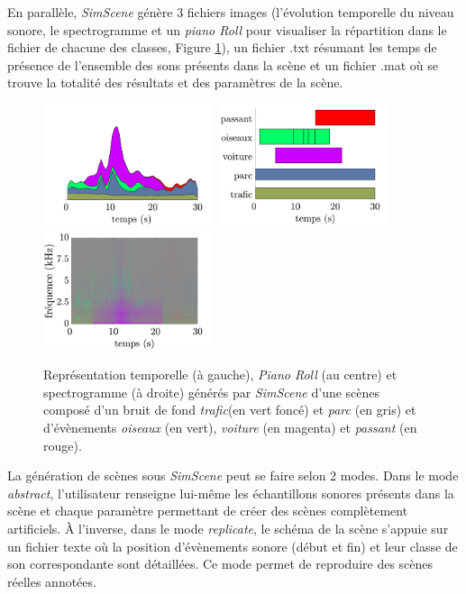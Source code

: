 En parallèle, \textit{SimScene} génère 3 fichiers images (l'évolution temporelle du niveau sonore, le spectrogramme et un \textit{piano Roll} pour visualiser la répartition dans le fichier de chacune des classes, Figure \ref{fig:somefiglabel}), un fichier .txt résumant les temps de présence de l'ensemble des sons présents dans la scène et un fichier .mat où se trouve la totalité des résultats et des paramètres de la scène.\\


\begin{figure}[ht]
\includegraphics[width=5cm]{./figures/SimScene/exemple-timeDomain.pdf}\hfill
\includegraphics[width=5cm]{./figures/SimScene/exemple-pianoRoll.pdf}\hfill
\includegraphics[width=5cm]{./figures/SimScene/exemple-spectrum.pdf}
\caption{Représentation temporelle (à gauche), \textit{Piano Roll} (au centre) et spectrogramme (à droite) générés par \textit{SimScene} d'une scènes composé d'un bruit de fond \textit{trafic}(en vert foncé) et \textit{parc} (en gris) et d'évènements \textit{oiseaux} (en vert), \textit{voiture} (en magenta) et \textit{passant} (en rouge).}\label{fig:somefiglabel}
\end{figure}

La génération de scènes sous \textit{SimScene} peut se faire selon 2 modes. Dans le mode \textit{abstract}, l'utilisateur renseigne lui-même les échantillons sonores présents dans la scène et chaque paramètre permettant de créer des scènes complètement artificiels. \`A l'inverse, dans le mode \textit{replicate}, le schéma de la scène s'appuie sur un fichier texte où la position d'évènements sonore (début et fin) et leur classe de son correspondante sont détaillées. Ce mode permet de reproduire des scènes réelles annotées.\\

